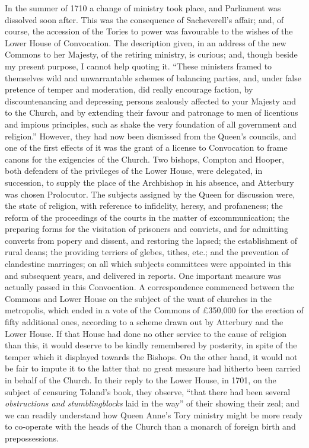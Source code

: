 In the summer of 1710 a change
of ministry took place, and Parliament was dissolved soon after. This
was the consequence of Sacheverell's affair; and, of course, the
accession of the Tories to power was favourable to the wishes of the
Lower House of Convocation. The description given, in an address of
the new Commons to her Majesty, of the retiring ministry, is curious;
and, though beside my present purpose, I cannot help quoting it. ``These
ministers framed to themselves wild and unwarrantable schemes of
balancing parties, and, under false pretence of temper and moderation,
did really encourage faction, by discountenancing and depressing
persons zealously affected to your Majesty and to the Church, and by
extending their favour and patronage to men of licentious and impious
principles, such as shake the very foundation of all government and
religion.'' However, they had now been dismissed from the Queen's
councils, and one of the first effects of it was the grant of a
license to Convocation to frame canons for the exigencies of the
Church. Two bishops, Compton and Hooper, both defenders of the
privileges of the Lower House, were delegated, in succession, to
supply the place of the Archbishop in his absence, and Atterbury was
chosen Prolocutor. The subjects assigned by the Queen for discussion
were, the state of religion, with reference to infidelity, heresy, and
profaneness; the reform of the proceedings of the courts in the matter
of excommunication; the preparing forms for the visitation of
prisoners and convicts, and for admitting converts from popery and
dissent, and restoring the lapsed; the establishment of rural deans;
the providing terriers of glebes, tithes, etc.; and the prevention of
clandestine marriages; on all which subjects committees were appointed
in this and subsequent years, and delivered in reports. One important
measure was actually passed in this Convocation. A correspondence
commenced between the Commons and Lower House on the subject of the
want of churches in the metropolis, which ended in a vote of the
Commons of £350,000 for the erection of fifty additional ones,
according to a scheme drawn out by Atterbury and the Lower House. If
that House had done no other service to the cause of religion than
this, it would deserve to be kindly remembered by posterity, in spite
of the temper which it displayed towards the Bishops. On the other
hand, it would not be fair to impute it to the latter that no
great measure had hitherto been carried in behalf of the Church. In
their reply to the Lower House, in 1701, on the subject of censuring
Toland's book, they observe, ``that there had been several \emph{obstructions
and stumblingblocks} laid in the way'' of their showing their zeal;
and we can readily understand how Queen Anne's Tory ministry might be
more ready to co-operate with the heads of the Church than a monarch
of foreign birth and prepossessions.

